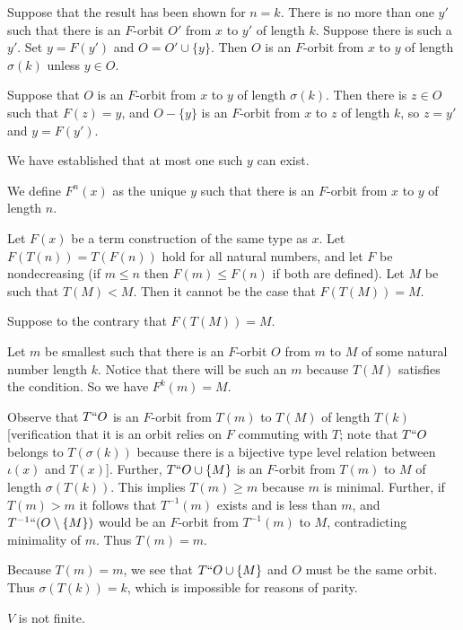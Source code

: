 \documentclass[12pt]{article}
\begin{document}
\begin{description}
Suppose that the result has been shown for $n=k$.   There is no more than one $y'$ such that there is an $F$-orbit $O'$ from
$x$ to $y'$ of length $k$.  Suppose there is such a $y'$.  Set $y=F(y')$ and $O = O' \cup \{y\}$.  Then $O$ is an $F$-orbit from $x$
 to $y$ of length $\sigma(k)$ unless $y \in O$.
 
 Suppose that $O$ is an $F$-orbit from $x$ to $y$ of length $\sigma(k)$.  Then there is $z \in O$ such that $F(z)=y$,
 and $O - \{y\}$ is an $F$-orbit from $x$ to $z$ of length $k$, so $z=y'$ and $y=F(y')$.
 
 We have established that at most one such $y$ can exist.
 
 \item [Definition:]  We define $F^n(x)$ as the unique $y$ such that there is an $F$-orbit from $x$ to $y$ of length $n$.
 
 \item[Baby Henson lemma:]  Let $F(x)$ be a term construction of the same type as $x$.  Let $F(T(n))=T(F(n))$ hold for all natural numbers, and let $F$ be nondecreasing (if $m \leq n$ then $F(m) \leq F(n)$ if both are defined). Let $M$ be such that $T(M) < M$.  Then it cannot be the case that $F(T(M))=M$.
 
 \item[Proof:]   Suppose to the contrary that $F(T(M))=M$.
 
 Let $m$ be smallest such that there is an $F$-orbit $O$ from $m$ to $M$ of some natural number length $k$.
 Notice that there will be such an $m$ because $T(M)$ satisfies the condition.  So we have $F^k(m)=M$.
 
 Observe that $T``O$ is an $F$-orbit from $T(m)$ to $T(M)$ of length $T(k)$ [verification that it is an orbit relies on $F$ commuting with $T$; note that $T``O$ belongs to $T(\sigma(k))$ because there is a bijective type level relation between $\iota(x)$ and $T(x)$].  Further, $T``O \cup \{M\}$ is an $F$-orbit from
 $T(m)$ to $M$ of length $\sigma(T(k))$.  This implies $T(m) \geq m$ because $m$ is minimal.  Further, if $T(m) > m$
 it follows that $T^{-1}(m)$ exists and is less than $m$, and $T^{-1}``(O \setminus \{M\})$ would be an $F$-orbit from
 $T^{-1}(m)$ to $M$, contradicting minimality of $m$.  Thus $T(m)=m$.
 
 Because $T(m)=m$, we see that $T``O \cup \{M\}$ and $O$ must be the same orbit.  Thus $\sigma(T(k))=k$, which is impossible for reasons of parity.
 
 \item[Theorem:]  $V$ is not finite.
 

\end{description}
\end{document}
